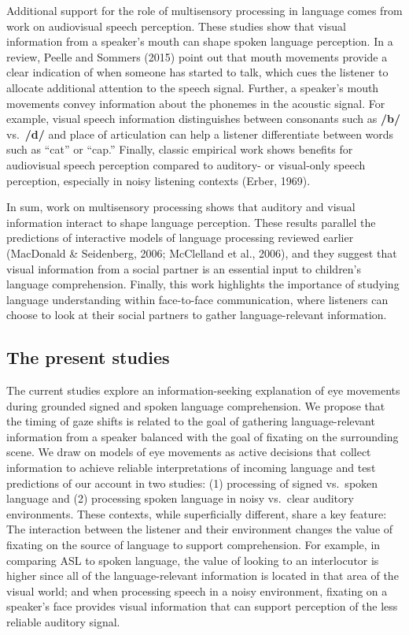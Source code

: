 \documentclass[,man,floatsintext]{apa6}
\begin{document}
Additional support for the role of multisensory processing in language comes from work on audiovisual speech perception. These studies show that visual information from a speaker's mouth can shape spoken language perception. In a review, Peelle and Sommers (2015) point out that mouth movements provide a clear indication of when someone has started to talk, which cues the listener to allocate additional attention to the speech signal. Further, a speaker's mouth movements convey information about the phonemes in the acoustic signal. For example, visual speech information distinguishes between consonants such as \textbf{/b/} vs.~\textbf{/d/} and place of articulation can help a listener differentiate between words such as \enquote{cat} or \enquote{cap.} Finally, classic empirical work shows benefits for audiovisual speech perception compared to auditory- or visual-only speech perception, especially in noisy listening contexts (Erber, 1969).

In sum, work on multisensory processing shows that auditory and visual information interact to shape language perception. These results parallel the predictions of interactive models of language processing reviewed earlier (MacDonald \& Seidenberg, 2006; McClelland et al., 2006), and they suggest that visual information from a social partner is an essential input to children's language comprehension. Finally, this work highlights the importance of studying language understanding within face-to-face communication, where listeners can choose to look at their social partners to gather language-relevant information.

\hypertarget{the-present-studies}{%
\subsection{The present studies}\label{the-present-studies}}

The current studies explore an information-seeking explanation of eye movements during grounded signed and spoken language comprehension. We propose that the timing of gaze shifts is related to the goal of gathering language-relevant information from a speaker balanced with the goal of fixating on the surrounding scene. We draw on models of eye movements as active decisions that collect information to achieve reliable interpretations of incoming language and test predictions of our account in two studies: (1) processing of signed vs.~spoken language and (2) processing spoken language in noisy vs.~clear auditory environments. These contexts, while superficially different, share a key feature: The interaction between the listener and their environment changes the value of fixating on the source of language to support comprehension. For example, in comparing ASL to spoken language, the value of looking to an interlocutor is higher since all of the language-relevant information is located in that area of the visual world; and when processing speech in a noisy environment, fixating on a speaker's face provides visual information that can support perception of the less reliable auditory signal.
\end{document}
